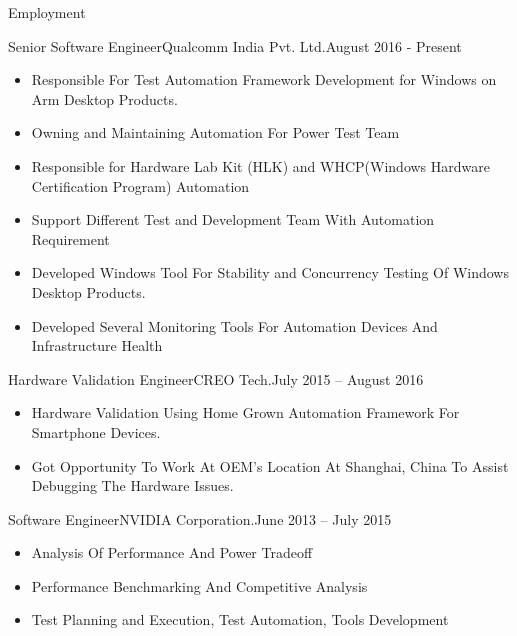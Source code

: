 \documentclass[]{mcdowellcv}
\begin{document}
	\makeheader
	
	\begin{cvsection}{Employment}
		\begin{cvsubsection}{Senior Software Engineer}{Qualcomm India Pvt. Ltd.}{August 2016 - Present}		
			\begin{itemize}
			\item Responsible For Test Automation Framework Development for Windows on Arm Desktop Products.
			\item Owning and Maintaining Automation For Power Test Team 
			\item Responsible for Hardware Lab Kit (HLK) and WHCP(Windows Hardware Certification Program) Automation
			\item Support Different Test and Development Team With Automation Requirement
			\item Developed Windows Tool For Stability and Concurrency Testing Of Windows Desktop Products.
			\item Developed Several Monitoring Tools For Automation Devices And Infrastructure Health			
			\end{itemize}
		\end{cvsubsection}
		
		\begin{cvsubsection}{Hardware Validation Engineer}{CREO Tech.}{July 2015 -- August 2016}	
			\begin{itemize}
				\item Hardware Validation Using Home Grown Automation Framework For Smartphone Devices.
				\item Got Opportunity To Work At OEM's Location At Shanghai, China To Assist Debugging The Hardware Issues.
			\end{itemize}
		\end{cvsubsection}
		
		\begin{cvsubsection}{Software Engineer}{NVIDIA Corporation.}{June 2013 -- July 2015}		
			\begin{itemize}
				\item Analysis Of Performance And Power Tradeoff 
				\item Performance Benchmarking And Competitive Analysis
				\item Test Planning and Execution, Test Automation, Tools Development 
			\end{itemize}
		\end{cvsubsection}
		
	\end{cvsection}
	
\end{document}
